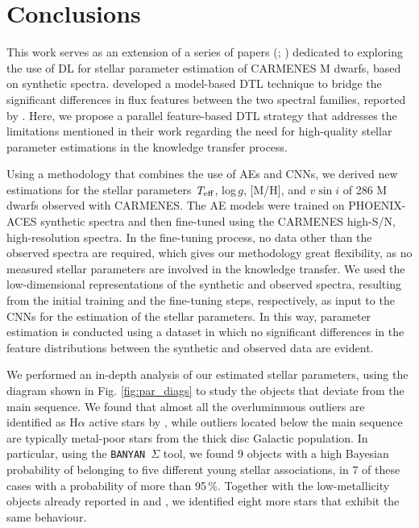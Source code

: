 

\section{Conclusions}\label{acs_sec:conclusions}

This work serves as an extension of a series of papers (; ) dedicated to exploring the use of DL for stellar parameter estimation of CARMENES M dwarfs, based on synthetic spectra.  developed a model-based DTL technique to bridge the significant differences in flux features between the two spectral families, reported by . Here, we propose a parallel feature-based DTL strategy that addresses the limitations mentioned in their work regarding the need for high-quality stellar parameter estimations in the knowledge transfer process.

Using a methodology that combines the use of AEs and CNNs, we derived new estimations for the stellar parameters $\textit{T}_{\rm eff}$, log\,$\textit{g}$, [M/H], and $\textit{v}\sin{i}$ of 286 M dwarfs observed with CARMENES. The AE models were trained on PHOENIX-ACES synthetic spectra and then fine-tuned using the CARMENES high-S/N, high-resolution spectra. In the fine-tuning process, no data other than the observed spectra are required, which gives our methodology great flexibility, as no measured stellar parameters are involved in the knowledge transfer. We used the low-dimensional representations of the synthetic and observed spectra, resulting from the initial training and the fine-tuning steps, respectively, as input to the CNNs for the estimation of the stellar parameters. In this way, parameter estimation is conducted using a dataset in which no significant differences in the feature distributions between the synthetic and observed data are evident.

We performed an in-depth analysis of our estimated stellar parameters, using the diagram shown in Fig. \ref{fig:par_diags} to study the objects that deviate from the main sequence. We found that almost all the overlumimuous outliers are identified as H$\alpha$ active stars by \citet{schofer2019}, while outliers located below the main sequence are typically metal-poor stars from the thick disc Galactic population. In particular, using the \texttt{BANYAN}~$\Sigma$ tool, we found 9 objects with a high Bayesian probability of belonging to five different young stellar associations, in 7 of these cases with a probability of more than 95\,\%. Together with the low-metallicity objects already reported in  and , we identified eight more stars that exhibit the same behaviour.

